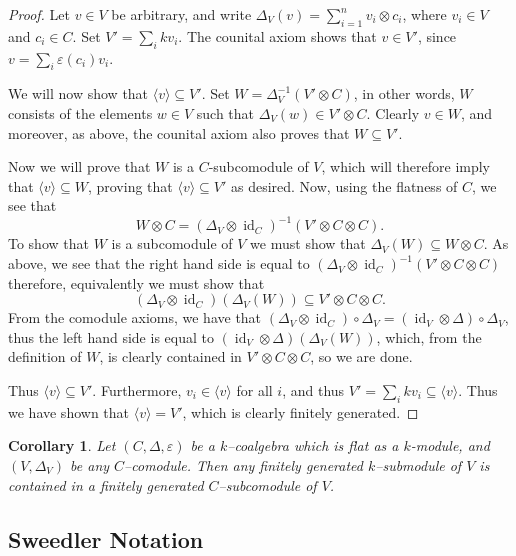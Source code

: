 \documentclass{article}
\theoremstyle{plain}
\newtheorem{Cor}[Th]{Corollary}
\theoremstyle{definition}
\DeclareMathOperator{\id}{id}
\begin{document}
\begin{proof}
    Let $v\in V$ be arbitrary, and write $\Delta_V(v)=\sum_{i=1}^n v_i\otimes c_i$, where $v_i\in V$ and $c_i\in C$. Set $V'=\sum_i kv_i$. The counital axiom shows that $v\in V'$, since $v=\sum_i \varepsilon(c_i)v_i$. 
    
    We will now show that $\langle v \rangle \subseteq V'$. Set $W=\Delta_V^{-1}(V'\otimes C)$, in other words, $W$ consists of the elements $w\in V$ such that $\Delta_V(w)\in V'\otimes C$. Clearly $v\in W$, and moreover, as above, the counital axiom also proves that $W\subseteq V'$.

    Now we will prove that $W$ is a $C$-subcomodule of $V$, which will therefore imply that $\langle v \rangle \subseteq W$, proving that $\langle v \rangle \subseteq V'$ as desired. Now, using the flatness of $C$, we see that 
    \[
    W\otimes C=(\Delta_V\otimes \id_C)^{-1}(V'\otimes C \otimes C).
    \]
    To show that $W$ is a subcomodule of $V$ we must show that $\Delta_V(W)\subseteq W\otimes C$. As above, we see that the right hand side is equal to $ (\Delta_V\otimes \id_C)^{-1}(V'\otimes C \otimes C)$  therefore, equivalently we must show that 
    \[
    (\Delta_V\otimes \id_C)(\Delta_V(W))\subseteq V'\otimes C \otimes C.
    \]
      From the comodule axioms, we have that $(\Delta_V\otimes \id_C)\circ \Delta_V=(\id_V\otimes \Delta)\circ \Delta_V$, thus the left hand side is equal to $(\id_V \otimes \Delta)(\Delta_V(W))$, which, from the definition of $W$, is clearly contained in $V'\otimes C \otimes C$, so we are done.

    

    Thus $\langle v \rangle \subseteq V'$. Furthermore, $v_i\in \langle v \rangle$ for all $i$, and thus $V'=\sum_i kv_i \subseteq \langle v \rangle$. Thus we have shown that $\langle v \rangle = V'$, which is clearly finitely generated.
\end{proof}

\begin{Cor}\label{locallyfinite}
    Let $(C, \Delta, \varepsilon)$ be a $k$--coalgebra which is flat as a $k$-module, and $(V, \Delta_V)$ be any $C$--comodule. Then any finitely generated $k$--submodule of $V$ is contained in a finitely generated ${C}$--subcomodule of $V$.
\end{Cor}


\subsection*{Sweedler Notation}
\end{document}
